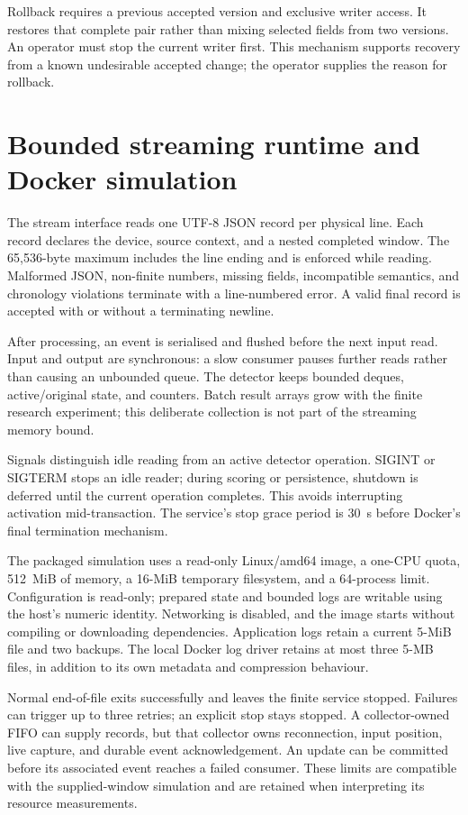Rollback requires a previous accepted version and exclusive writer access.
It restores that complete pair rather than mixing selected fields from
two versions. An operator must stop the current writer first. This
mechanism supports recovery from a known undesirable accepted change;
the operator supplies the reason for rollback.

\section{Bounded streaming runtime and Docker simulation}
\label{sec:streaming}

The stream interface reads one UTF-8 JSON record per physical line. Each
record declares the device, source context, and a nested completed window.
The 65,536-byte maximum includes the line ending and is enforced while
reading. Malformed JSON, non-finite numbers, missing fields, incompatible
semantics, and chronology violations terminate with a line-numbered error.
A valid final record is accepted with or without a terminating newline.

After processing, an event is serialised and flushed before the next
input read. Input and output are synchronous: a slow consumer pauses
further reads rather than causing an unbounded queue. The detector keeps
bounded deques, active/original state, and counters. Batch result arrays
grow with the finite research experiment; this deliberate collection is
not part of the streaming memory bound.

Signals distinguish idle reading from an active detector operation.
SIGINT or SIGTERM stops an idle reader; during scoring or persistence,
shutdown is deferred until the current operation completes. This avoids
interrupting activation mid-transaction. The service's stop grace period is
30~s before Docker's final termination mechanism.

The packaged simulation uses a read-only Linux/amd64 image, a one-CPU
quota, 512~MiB of memory, a 16-MiB temporary filesystem, and a 64-process
limit. Configuration is read-only; prepared state and bounded logs are
writable using the host's numeric identity. Networking is disabled, and
the image starts without compiling or downloading dependencies.
Application logs retain a current 5-MiB file and two backups. The local
Docker log driver retains at most three 5-MB files, in addition to its
own metadata and compression behaviour.

Normal end-of-file exits successfully and leaves the finite service
stopped. Failures can trigger up to three retries; an explicit stop stays
stopped. A collector-owned FIFO can supply records, but that collector
owns reconnection, input position, live capture, and durable event
acknowledgement. An update can be
committed before its associated event reaches a failed consumer. These
limits are compatible with the supplied-window simulation and are retained
when interpreting its resource measurements.

